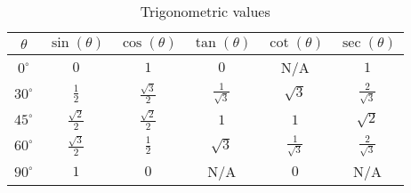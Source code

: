 \begin{spacing}{1.5}

\lipsum[2]
\begin{table}[h!]
    \centering
    \caption{\centering Trigonometric values}
    \label{tab:defence}
\begin{tabular}{|c|c|c|c|c|c|}
  \hline
  $\theta$ & $\sin(\theta)$ & $\cos(\theta)$ & $\tan(\theta)$ & $\cot(\theta)$ & $\sec(\theta)$ \\
  \hline
  $0^\circ$ & $0$ & $1$ & $0$ & N/A & $1$ \\
  \hline
  $30^\circ$ & $\frac{1}{2}$ & $\frac{\sqrt{3}}{2}$ & $\frac{1}{\sqrt{3}}$ & $\sqrt{3}$ & $\frac{2}{\sqrt{3}}$ \\
  \hline
  $45^\circ$ & $\frac{\sqrt{2}}{2}$ & $\frac{\sqrt{2}}{2}$ & $1$ & $1$ & $\sqrt{2}$ \\
  \hline
  $60^\circ$ & $\frac{\sqrt{3}}{2}$ & $\frac{1}{2}$ & $\sqrt{3}$ & $\frac{1}{\sqrt{3}}$ & $\frac{2}{\sqrt{3}}$ \\
  \hline
  $90^\circ$ & $1$ & $0$ & N/A & $0$ & N/A \\
  \hline
\end{tabular}
\end{table}

\end{spacing}
